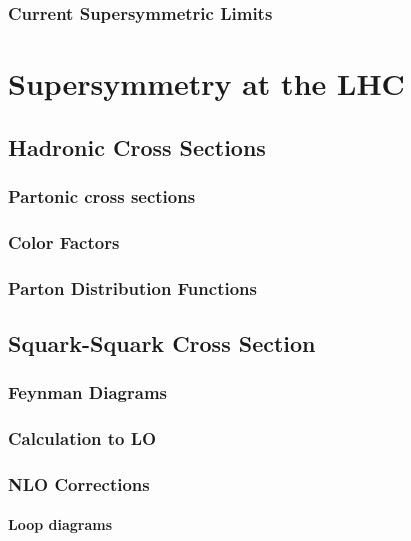 \documentclass[twoside,english]{uiofysmaster}
\begin{document}
\subsection{Current Supersymmetric Limits}



\chapter{Supersymmetry at the LHC}

\section{Hadronic Cross Sections}

\subsection{Partonic cross sections}

\subsection{Color Factors}

\subsection{Parton Distribution Functions}

\section{Squark-Squark Cross Section}

\subsection{Feynman Diagrams}

\subsection{Calculation to LO}

\subsection{NLO Corrections}

\subsubsection{Loop diagrams}
\end{document}
